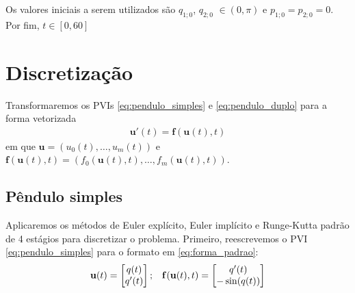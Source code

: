 \documentclass{article}
\begin{document}
    Os valores iniciais a serem utilizados são $q_{1; 0}$, $q_{2;0}$ $\in (0,\pi)$ e $p_{1;0} = p_{2;0} = 0$. Por fim, $t\in[0,60]$

    \section{Discretização}
    Transformaremos os PVIs \ref{eq:pendulo_simples} e \ref{eq:pendulo_duplo} para a forma vetorizada
    \begin{align}
        \mathbf{u}'(t) = \mathbf{f}(\mathbf{u}(t), t) \label{eq:forma_padrao}
    \end{align}
    em que $\mathbf{u} = (u_0(t), \dots, u_m(t))$ e $\mathbf{f}(\mathbf{u}(t), t) = (f_0(\mathbf{u}(t),t), \dots, f_m(\mathbf{u}(t),t))$.
    
    \subsection{Pêndulo simples}
    Aplicaremos os métodos de Euler explícito, Euler implícito e Runge-Kutta padrão de 4 estágios para discretizar o problema. Primeiro, reescrevemos o PVI \ref{eq:pendulo_simples} para o formato em \ref{eq:forma_padrao}:
    \begin{align}
        \mathbf{u}(t) = \begin{bmatrix}
            q(t) \\
            q'(t)
        \end{bmatrix}; &&
        \mathbf{f}(\mathbf{u}(t),t) = \begin{bmatrix}
                q'(t) \\
                -\sin(q(t))
        \end{bmatrix} \notag
    \end{align}
\end{document}

